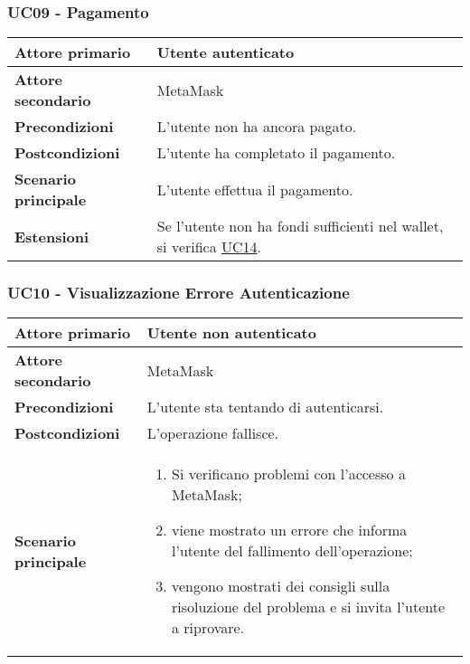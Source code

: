 \subsubsection{UC09 - Pagamento}
\label{UC09}
\begin{center}
\renewcommand{\arraystretch}{1.5}
\begin{tabular}{ | m{10em} | m{20em} | }
    \hline
    \textbf{Attore primario} & Utente autenticato \\
    \hline
    \textbf{Attore secondario} & MetaMask \\
    \hline
    \textbf{Precondizioni} & L'utente non ha ancora pagato. \\
    \hline
    \textbf{Postcondizioni} & L'utente ha completato il pagamento. \\
    \hline
    \textbf{Scenario principale} & L'utente effettua il pagamento. \\
    \hline
    \textbf{Estensioni} & Se l'utente non ha fondi sufficienti nel wallet, si verifica \hyperref[UC14]{UC14}.\\
    \hline
   \end{tabular}
\end{center}

\subsubsection{UC10 - Visualizzazione Errore Autenticazione}
\label{UC10}
\begin{center}
\renewcommand{\arraystretch}{1.5}
\begin{tabular}{ | m{10em} | m{20em} | }
    \hline
    \textbf{Attore primario} & Utente non autenticato \\
    \hline
    \textbf{Attore secondario} & MetaMask \\
    \hline
    \textbf{Precondizioni} & L'utente sta tentando di autenticarsi. \\
    \hline
    \textbf{Postcondizioni} & L'operazione fallisce. \\
    \hline
    \textbf{Scenario principale} & \begin{enumerate}
        \item Si verificano problemi con l'accesso a MetaMask;
        \item viene mostrato un errore che informa l'utente del fallimento dell'operazione;
        \item vengono mostrati dei consigli sulla risoluzione del problema e si invita
              l'utente a riprovare.
    \end{enumerate} \\
    \hline
   \end{tabular}
\end{center}

